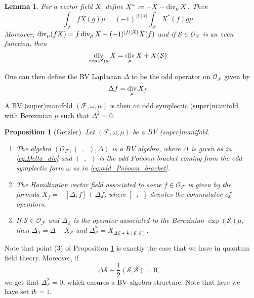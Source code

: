 \documentclass[11pt,colorinlistoftodos]{amsart}
\numberwithin{equation}{subsection}
\theoremstyle{plain}
\newtheorem{lem}[thm]{Lemma}
\newtheorem{prop}[thm]{Proposition}
\theoremstyle{definition}
\theoremstyle{remark}
\DeclareMathOperator{\Div}{\textnormal{div}}
\newcommand{\calS}{\mathcal{S}}
\newcommand{\calO}{\mathcal{O}}
\newcommand{\calF}{\mathcal{F}}
\newcommand{\I}{\mathrm{i}}
\begin{document}
\begin{lem}
For a vector field $X$, define $X^*:=-X-\Div_\mu X$. Then 
\begin{equation}
    \int_\calF fX(g)\mu=(-1)^{\vert f\vert\vert X\vert}\int_\calF X^*(f)g\mu.
\end{equation}
Moreover, $\Div_\mu(fX)=f\Div_\mu X-(-1)^{\vert f\vert \vert X\vert}X(f)$ and if $\calS\in \calO_\calF$ is an even function, then
\[
\Div_{\exp(\calS)\mu}X=\Div_\mu X+X(\calS).
\]
\end{lem}
One can then define the BV Laplacian $\Delta$ to be the odd operator on $\calO_\calF$ given by
\begin{equation}
\label{eq:Delta_div}
    \Delta f=\Div_\mu X_f.
\end{equation}
A BV (super)manifold $(\calF,\omega,\mu)$ is then an odd symplectic (super)manifold with Berezinian $\mu$ such that $\Delta^2=0$.
\begin{prop}[Getzler\cite{Getzler1994}]
\label{prop:Getzler}
Let $(\calF,\omega,\mu)$ be a BV (super)manifold.
\begin{enumerate}
    \item The algebra $(\calO_\calF,(\enspace,\enspace),\Delta)$ is a BV algebra, where $\Delta$ is given as in \eqref{eq:Delta_div} and $(\enspace,\enspace)$ is the odd Poisson bracket coming from the odd symplectic form $\omega$ as in \eqref{eq:odd_Poisson_bracket}.
    \item The Hamiltonian vector field associated to some $f\in \calO_\calF$ is given by the formula $X_f=-[\Delta,f]+\Delta f$, where $[\enspace,\enspace]$ denotes the commutator of operators.
    \item If $\calS\in \calO_\calF$ and $\Delta_\calS$ is the operator associated to the Berezinian $\exp(\calS)\mu$, then $\Delta_\calS=\Delta-X_\calS$ and $\Delta_\calS^2=X_{\Delta \calS+\frac{1}{2}(\calS,\calS)}$.
\end{enumerate}
\end{prop}
Note that point (3) of Proposition \ref{prop:Getzler} is exactly the case that we have in quantum field theory. Moreover, if 
\begin{equation}
\label{eq:QME_BV_alg}
    \Delta \calS+\frac{1}{2}(\calS,\calS)=0,
\end{equation}
we get that $\Delta_\calS^2=0$, which ensures a BV algebra structure. Note that here we have set $\I\hbar=1$.
\end{document}
